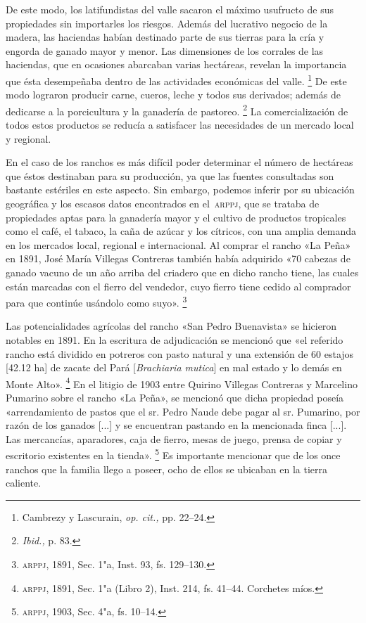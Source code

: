 \documentclass[14pt,twoside,final]{extbook} %
\let\oldfootnote\footnote
\renewcommand\footnote[1]{%
\oldfootnote{\hspace{1mm}#1}}
\begin{document}
De este modo, los latifundistas del valle sacaron el máximo usufructo de sus propiedades sin importarles los riesgos. Además del lucrativo negocio de la madera, las haciendas habían destinado parte de sus tierras para la cría y engorda de ganado mayor y menor. Las dimensiones de los corrales de las haciendas, que en ocasiones abarcaban varias hectáreas, revelan la importancia que ésta desempeñaba dentro de las actividades económicas del valle.\footnote{Cambrezy y Lascurain, \emph{op. cit.,} pp. 22--24.} De este modo lograron producir carne, cueros, leche y todos sus derivados; además de dedicarse a la porcicultura y la ganadería de pastoreo.\footnote{\emph{Ibid.,} p. 83.} La comercialización de todos estos productos se reducía a satisfacer las necesidades de un mercado local y regional.\pagebreak[4]

En el caso de los ranchos es más difícil poder determinar el número de hectáreas que éstos destinaban para su producción, ya que las fuentes consultadas son bastante estériles en este aspecto. Sin embargo, podemos inferir por su ubicación geográfica y los escasos datos encontrados en el~\textsc{arppj}, que se trataba de propiedades aptas para la ganadería mayor y el cultivo de productos tropicales como el café, el tabaco, la caña de azúcar y los cítricos, con una amplia demanda en los mercados local, regional e internacional. Al comprar el rancho «La Peña» en 1891, José María Villegas Contreras también había adquirido «70 cabezas de ganado vacuno de un año arriba del criadero que en dicho rancho tiene, las cuales están marcadas con el fierro del vendedor, cuyo fierro tiene cedido al comprador para que continúe usándolo como suyo».\footnote{\textsc{arppj}, 1891, Sec. 1"a, Inst. 93, fs. 129--130.}

Las potencialidades agrícolas del rancho «San Pedro Buenavista» se hicieron notables en 1891. En la escritura de adjudicación se mencionó que «el referido rancho está dividido en potreros con pasto natural y una extensión de 60 estajos [42.12 ha] de zacate del Pará [\emph{Brachiaria mutica}] en mal estado y lo demás en Monte Alto».\footnote{\textsc{arppj}, 1891, Sec. 1"a (Libro 2), Inst. 214, fs. 41--44. Corchetes míos.} En el litigio de 1903 entre Quirino Villegas Contreras y Marcelino Pumarino sobre el rancho «La Peña», se mencionó que dicha propiedad poseía «arrendamiento de pastos que el sr. Pedro Naude debe pagar al sr. Pumarino, por razón de los ganados [...] y se encuentran pastando en la mencionada finca [...]. Las mercancías, aparadores, caja de fierro, mesas de juego, prensa de copiar y escritorio existentes en la tienda».\footnote{\textsc{arppj}, 1903, Sec. 4"a, fs. 10--14.} Es importante mencionar que de los once ranchos que la familia llego a poseer, ocho de ellos se ubicaban en la tierra caliente.
\end{document}
